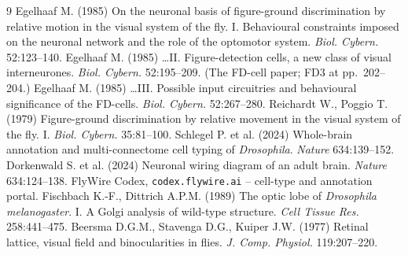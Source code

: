 \documentclass[11pt]{article}
\begin{document}
\begin{thebibliography}{9}
 Egelhaaf M. (1985) On the neuronal basis of figure-ground discrimination by relative motion in the visual system of the fly. I. Behavioural constraints imposed on the neuronal network and the role of the optomotor system. \textit{Biol. Cybern.} 52:123--140.
 Egelhaaf M. (1985) \ldots II. Figure-detection cells, a new class of visual interneurones. \textit{Biol. Cybern.} 52:195--209. (The FD-cell paper; FD3 at pp.~202--204.)
 Egelhaaf M. (1985) \ldots III. Possible input circuitries and behavioural significance of the FD-cells. \textit{Biol. Cybern.} 52:267--280.
 Reichardt W., Poggio T. (1979) Figure-ground discrimination by relative movement in the visual system of the fly. I. \textit{Biol. Cybern.} 35:81--100.
 Schlegel P. et al. (2024) Whole-brain annotation and multi-connectome cell typing of \textit{Drosophila}. \textit{Nature} 634:139--152.
 Dorkenwald S. et al. (2024) Neuronal wiring diagram of an adult brain. \textit{Nature} 634:124--138.
 FlyWire Codex, \texttt{codex.flywire.ai} -- cell-type and annotation portal.
 Fischbach K.-F., Dittrich A.P.M. (1989) The optic lobe of \textit{Drosophila melanogaster}. I. A Golgi analysis of wild-type structure. \textit{Cell Tissue Res.} 258:441--475.
 Beersma D.G.M., Stavenga D.G., Kuiper J.W. (1977) Retinal lattice, visual field and binocularities in flies. \textit{J. Comp. Physiol.} 119:207--220.
\end{thebibliography}
\end{document}
